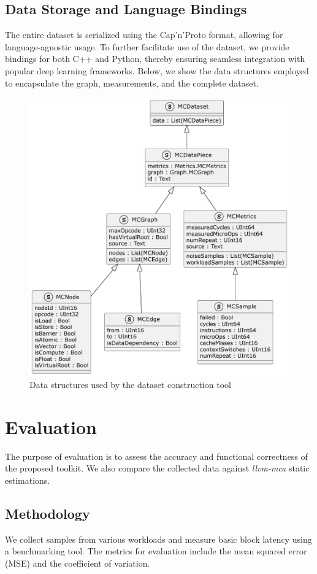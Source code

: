 \subsection{Data Storage and Language Bindings}

The entire dataset is serialized using the Cap'n'Proto format, allowing for language-agnostic usage. 
To further facilitate use of the dataset, we provide bindings for both C++ and Python, thereby ensuring 
seamless integration with popular deep learning frameworks. Below, we show the data structures employed 
to encapsulate the graph, measurements, and the complete dataset.

\begin{figure}[h]
  \caption{Data structures used by the dataset construction tool}
  \centering
  \includegraphics[width=0.9\columnwidth]{data_structures}
\end{figure}

\section{Evaluation}

The purpose of evaluation is to assess the accuracy and functional correctness of the proposed toolkit.
We also compare the collected data against \textit{llvm-mca} static estimations.

\subsection{Methodology}
We collect samples from various workloads and measure basic block latency using a benchmarking tool.
The metrics for evaluation include the mean squared error (MSE) and the coefficient of variation.

